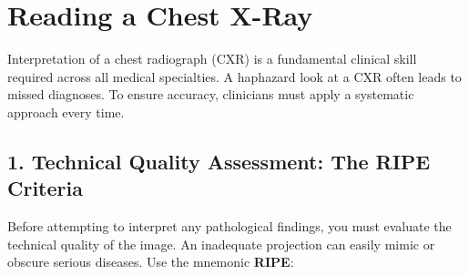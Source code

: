 \chapter{Reading a Chest X-Ray}

\label{ch:read_cxr}

Interpretation of a chest radiograph (CXR) is a fundamental clinical skill required across all medical specialties. A haphazard look at a CXR often leads to missed diagnoses. To ensure accuracy, clinicians must apply a systematic approach every time.


\section*{1. Technical Quality Assessment: The RIPE Criteria}
Before attempting to interpret any pathological findings, you must evaluate the technical quality of the image. An inadequate projection can easily mimic or obscure serious diseases. Use the mnemonic \textbf{RIPE}:

